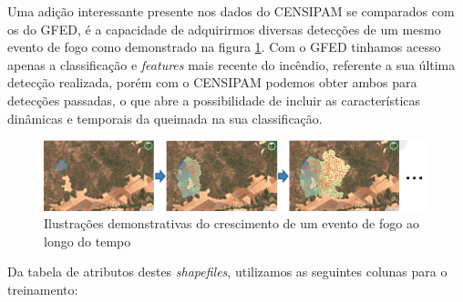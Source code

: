 Uma adição interessante presente nos dados do CENSIPAM se comparados com os do GFED, é a capacidade de adquirirmos diversas detecções de um mesmo evento de fogo como demonstrado na figura \ref{fig:progressao}. Com o GFED tinhamos acesso apenas a classificação e \textit{features} mais recente do incêndio, referente a sua última detecção realizada, porém com o CENSIPAM podemos obter ambos para detecções passadas, o que abre a possibilidade de incluir as características dinâmicas e temporais da queimada na sua classificação.



\begin{figure}[htb]
	\centering
	\begin{minipage}{0.9\linewidth}
		\centering
		\includegraphics[width=\linewidth]{tg1/figuras/progressao_queimada.png}
		\caption{Ilustrações demonstrativas do crescimento de um evento de fogo ao longo do tempo} \label{fig:progressao}
	\end{minipage}
\end{figure}

Da tabela de atributos destes \textit{shapefiles}, utilizamos as seguintes colunas para o treinamento:

\newpage


